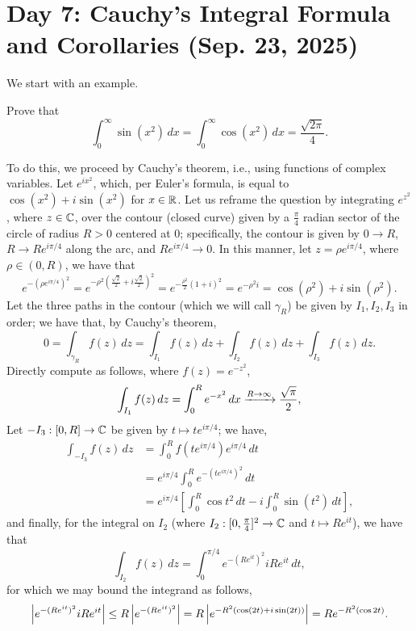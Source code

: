 \section{Day 7: Cauchy's Integral Formula and Corollaries (Sep. 23, 2025)}
We start with an example.
\begin{example}
    Prove that
    \[ \int_0^\infty \sin (x^2) \, dx = \int_0^\infty \cos(x^2) \, dx = \frac{\sqrt{2\pi}}{4}. \]
\end{example}
\begin{solution}
    To do this, we proceed by Cauchy's theorem, i.e., using functions of complex variables. Let $e^{ix^2}$, which, per Euler's formula, is equal to $\cos(x^2) + i \sin(x^2)$ for $x \in \mathbb R$. Let us reframe the question by integrating $e^{z^2}$, where $z \in \mathbb C$, over the contour (closed curve) given by a $\frac{\pi}{4}$ radian sector of the circle of radius $R > 0$ centered at $0$; specifically, the contour is given by $0 \to R$, $R \to R e^{i \pi/4}$ along the arc, and $R e^{i \pi/4} \to 0$. In this manner, let $z = \rho e^{i \pi/4}$, where $\rho \in (0, R)$, we have that
    \[ e^{-(\rho e^{i \pi/4})^2} = e^{-\rho^2 \left(\frac{\sqrt{2}}{2} + i \frac{\sqrt{2}}{2}\right)^2} = e^{-\frac{\rho^2}{2} (1 + i)^2} = e^{-\rho^2 i} = \cos(\rho^2) + i \sin(\rho^2). \]
    Let the three paths in the contour (which we will call $\gamma_R$) be given by $I_1, I_2, I_3$ in order; we have that, by Cauchy's theorem,
    \[ 0 = \int_{\gamma_R} f(z) \, dz = \int_{I_1} f(z) \, dz + \int_{I_2} f(z) \, dz + \int_{I_3} f(z) \, dz. \]
    Directly compute as follows, where $f(z) = e^{-z^2}$,
    \[ \int_{I_1} f(z) \, dz = \int_0^R e^{-x^2} \, dx \xrightarrow{R \to \infty} \frac{\sqrt{\pi}}{2}, \]
    Let $-I_3 : [0, R] \to \mathbb C$ be given by $t \mapsto t e^{i\pi/4}$; we have,
    \begin{align*}
        \int_{-I_3} f(z) \, dz &= \int_0^R f\left(te^{i \pi/4}\right) e^{i\pi/4} \, dt \\
        &= e^{i\pi/4} \int_0^R e^{-(te^{i\pi/4})^2} \, dt \\
        &= e^{i\pi/4} \left[\int_0^R \cos t^2 \, dt - i \int_0^R \sin(t^2) \, dt \right],
    \end{align*}
    and finally, for the integral on $I_2$ (where $I_2 : [0, \frac{\pi}{4}]^2 \to \mathbb C$ and $t \mapsto Re^{it}$), we have that
    \[ \int_{I_2} f(z) \, dz = \int_0^{\pi/4} e^{-(Re^{it})^2} i Re^{it} \, dt, \]
    for which we may bound the integrand as follows,
    \[ \left\lvert e^{-(Re^{it})^2} i Re^{it} \right\rvert \leq R \left\lvert e^{-(Re^{it})^2} \right\rvert = R \left\lvert e^{-R^2(\cos (2t) + i \sin(2t))} \right\rvert = Re^{-R^2(\cos 2t)}. \]

\end{solution}
